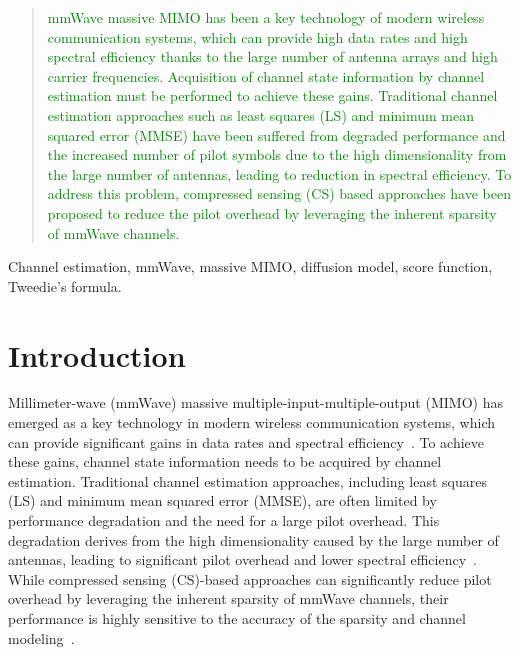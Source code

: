 \documentclass[lettersize,journal]{IEEEtran}
\begin{document}
\maketitle
\begin{abstract}
\textcolor{green}{
  mmWave massive MIMO has been a key technology of modern wireless communication systems, which can provide high data rates and high spectral efficiency thanks to the large number of antenna arrays and high carrier frequencies. Acquisition of channel state information by channel estimation must be performed to achieve these gains. Traditional channel estimation approaches such as least squares (LS) and minimum mean squared error (MMSE) have been suffered from degraded performance and the increased number of pilot symbols due to the high dimensionality from the large number of antennas, leading to reduction in spectral efficiency. To address this problem, compressed sensing (CS) based approaches have been proposed to reduce the pilot overhead by leveraging the inherent sparsity of mmWave channels.
}
\end{abstract}

\begin{IEEEkeywords}
Channel estimation, mmWave, massive MIMO, diffusion model, score function, Tweedie's formula.
\end{IEEEkeywords}


\section{Introduction}

Millimeter-wave (mmWave) massive multiple-input-multiple-output (MIMO) has emerged as a key technology in modern wireless communication systems, which can provide significant gains in data rates and spectral efficiency~\cite{rappaportWirelessCommunicationsApplications2019}. To achieve these gains, channel state information needs to be acquired by channel estimation. Traditional channel estimation approaches, including least squares (LS) and minimum mean squared error (MMSE), are often limited by performance degradation and the need for a large pilot overhead. This degradation derives from the high dimensionality caused by the large number of antennas, leading to significant pilot overhead and lower spectral efficiency~\cite{hassibiHowMuchTraining2003}. While compressed sensing (CS)-based approaches can significantly reduce pilot overhead by leveraging the inherent sparsity of mmWave channels, their performance is highly sensitive to the accuracy of the sparsity and channel modeling~\cite{zhangAtomicNormDenoisingBased2018,mendez-rialHybridMIMOArchitectures2016,choiCompressedSensingWireless2017}.
\end{document}
